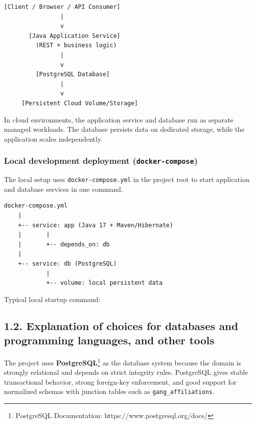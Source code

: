 \begin{verbatim}
[Client / Browser / API Consumer]
                |
                v
       [Java Application Service]
         (REST + business logic)
                |
                v
         [PostgreSQL Database]
                |
                v
     [Persistent Cloud Volume/Storage]
\end{verbatim}

In cloud environments, the application service and database run as
separate managed workloads. The database persists data on dedicated
storage, while the application scales independently.

\hypertarget{local-development-deployment-docker-compose}{%
\subsubsection{\texorpdfstring{Local development deployment
(\texttt{docker-compose})}{Local development deployment (docker-compose)}}\label{local-development-deployment-docker-compose}}

The local setup uses \texttt{docker-compose.yml} in the project root to
start application and database services in one command.

\begin{verbatim}
docker-compose.yml
    |
    +-- service: app (Java 17 + Maven/Hibernate)
    |       |
    |       +-- depends_on: db
    |
    +-- service: db (PostgreSQL)
            |
            +-- volume: local persistent data
\end{verbatim}

Typical local startup command:

\begin{Shaded}
\begin{Highlighting}[]
\end{Highlighting}
\end{Shaded}

\newpage

\hypertarget{explanation-of-choices-for-databases-and-programming-languages-and-other-tools}{%
\subsection{1.2. Explanation of choices for databases and programming
languages, and other
tools}\label{explanation-of-choices-for-databases-and-programming-languages-and-other-tools}}

The project uses \textbf{PostgreSQL}\footnote{PostgreSQL Documentation:
  https://www.postgresql.org/docs/} as the database system because the
domain is strongly relational and depends on strict integrity rules.
PostgreSQL gives stable transactional behavior, strong foreign-key
enforcement, and good support for normalized schemas with junction
tables such as \texttt{gang\_affiliations}.

